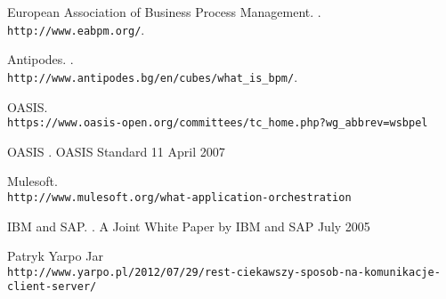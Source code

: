 \documentclass[11pt]{aghdpl}
\author{Tomasz Landowski}
\date{2014}
\begin{document}
\titlepages
\setcounter{tocdepth}{3}
\tableofcontents
\clearpage










\begin{thebibliography}{1}

%
%

European Association of Business Process Management.
.
\newblock \\\texttt{http://www.eabpm.org/}.


Antipodes.
.
\newblock \\\texttt{http://www.antipodes.bg/en/cubes/what\_is\_bpm/}.

OASIS.
\newblock \\\texttt{https://www.oasis-open.org/committees/tc\_home.php?wg\_abbrev=wsbpel}

OASIS
.
\newblock OASIS Standard 11 April 2007 

Mulesoft.
\newblock \\\texttt{http://www.mulesoft.org/what-application-orchestration}

IBM and SAP.
.
\newblock A Joint White Paper by IBM and SAP July 2005 

Patryk Yarpo Jar
\newblock \\\texttt{http://www.yarpo.pl/2012/07/29/rest-ciekawszy-sposob-na-komunikacje-client-server/}

\end{thebibliography}
\end{document}
